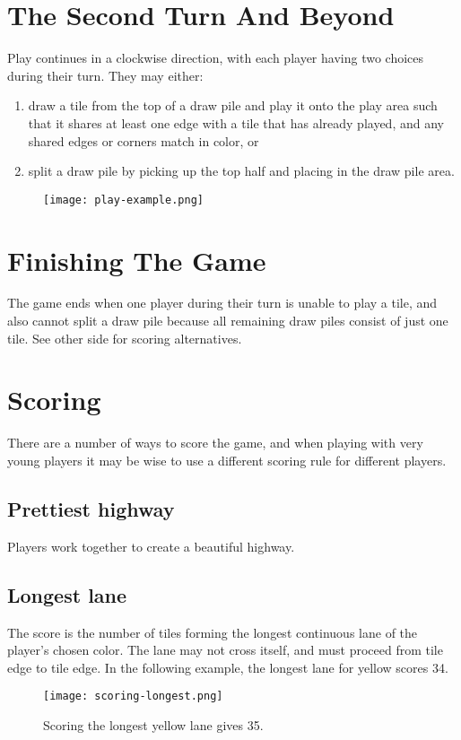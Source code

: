 \documentclass[twocolumn, 11pt]{article}
\begin{document}
\section*{The Second Turn And Beyond}
Play continues in a clockwise direction, with each player having two
choices during their turn.  They may either:
\begin{enumerate}
\item draw a tile from the top of a draw pile and play it onto the
  play area such that it shares at least one edge with a tile that has
  already played, and any shared edges or corners match in color,
  or
\item split a draw pile by picking up the top half and placing
  in the draw pile area.
\end{enumerate}
\begin{figure}[th]
  \texttt{[image: play-example.png]}
\end{figure}

\section*{Finishing The Game}
The game ends when one player during their turn is unable to play a
tile, and also cannot split a draw pile because all remaining draw
piles consist of just one tile.  See other side for scoring
alternatives.

\section*{Scoring}
There are a number of ways to score the game, and when playing with
very young players it may be wise to use a different scoring rule for
different players.
\subsection*{Prettiest highway}
Players work together to create a beautiful highway.
\subsection*{Longest lane}
The score is the number of tiles forming the longest continuous lane
of the player’s chosen color. The lane may not cross itself, and must
proceed from tile edge to tile edge.  In the following example, the
longest lane for yellow scores 34.

\begin{figure}[h]
  \texttt{[image: scoring-longest.png]}
  \caption{Scoring the longest yellow lane gives 35.}
\end{figure}
\end{document}
